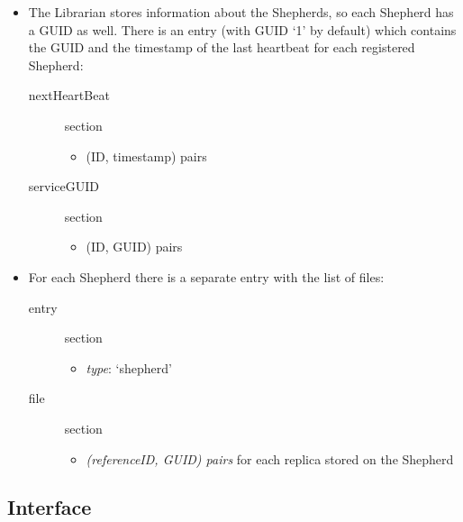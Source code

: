 \documentclass{book}
\begin{document}
\begin{itemize}
    \item The Librarian stores information about the Shepherds, so each Shepherd has a GUID as well. There is an entry (with GUID `1' by default) which contains the GUID and the timestamp of the last heartbeat for each registered Shepherd:
    \begin{description}
    	\item [nextHeartBeat] section
    	\begin{itemize}
    		\item (ID, timestamp) pairs
    	\end{itemize}
    	\item [serviceGUID] section
        \begin{itemize}
            \item (ID, GUID) pairs
        \end{itemize}
    \end{description}

    \item For each Shepherd there is a separate entry with the list of files:
    \begin{description}
    	\item [entry] section
        \begin{itemize}
            \item \emph{type}: `shepherd'
        \end{itemize}
    	\item [file] section
    	\begin{itemize}
    	    \item \emph{(referenceID, GUID) pairs} for each replica stored on the Shepherd
    	\end{itemize}
    \end{description}
\end{itemize}


\subsection{Interface} %
\end{document}
